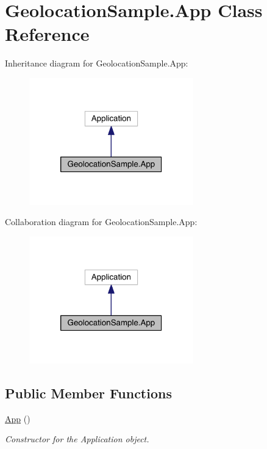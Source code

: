 \hypertarget{class_geolocation_sample_1_1_app}{\section{Geolocation\+Sample.\+App Class Reference}
\label{class_geolocation_sample_1_1_app}
}


Inheritance diagram for Geolocation\+Sample.\+App\+:
\nopagebreak
\begin{figure}[H]
\begin{center}
\leavevmode
\includegraphics[width=202pt]{class_geolocation_sample_1_1_app__inherit__graph}
\end{center}
\end{figure}


Collaboration diagram for Geolocation\+Sample.\+App\+:
\nopagebreak
\begin{figure}[H]
\begin{center}
\leavevmode
\includegraphics[width=202pt]{class_geolocation_sample_1_1_app__coll__graph}
\end{center}
\end{figure}
\subsection*{Public Member Functions}
\begin{DoxyCompactItemize}
\item 
\hyperlink{class_geolocation_sample_1_1_app_a8ca9f81d1e0700c208b07d1e4d389df7}{App} ()
\begin{DoxyCompactList}\small\item\em Constructor for the Application object. \end{DoxyCompactList}\end{DoxyCompactItemize}
